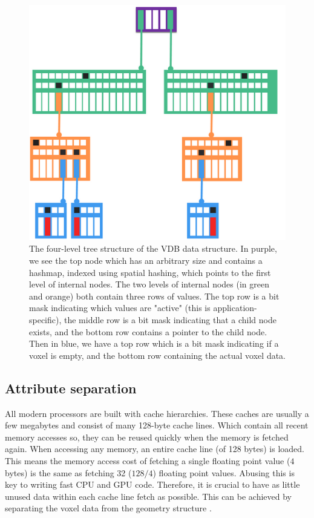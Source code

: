 \begin{figure}
    \centering
    \includegraphics[width=\linewidth]{figures/OpenVDB.png}
    \caption{The four-level tree structure of the VDB data structure. In purple, we see the top node which has an arbitrary size and contains a hashmap, indexed using spatial hashing, which points to the first level of internal nodes. The two levels of internal nodes (in green and orange) both contain three rows of values. The top row is a bit mask indicating which values are "active" (this is application-specific), the middle row is a bit mask indicating that a child node exists, and the bottom row contains a pointer to the child node. Then in blue, we have a top row which is a bit mask indicating if a voxel is empty, and the bottom row containing the actual voxel data. \cite{museth2013vdb}}
    \vspace{-30pt}
    \label{fig:VDB}
\end{figure}




\subsection{Attribute separation} \label{related_work:attribute_separation}
All modern processors are built with cache hierarchies. These caches are usually a few megabytes and consist of many 128-byte cache lines. Which contain all recent memory accesses so, they can be reused quickly when the memory is fetched again. When accessing any memory, an entire cache line (of 128 bytes) is loaded. This means the memory access cost of fetching a single floating point value ($4$ bytes) is the same as fetching 32 ($128/4$) floating point values. Abusing this is key to writing fast CPU and GPU code. Therefore, it is crucial to have as little unused data within each cache line fetch as possible. This can be achieved by separating the voxel data from the geometry structure \cite{dado2016geometry}.
